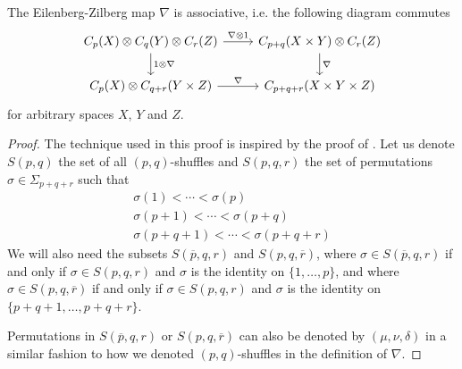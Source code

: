 \documentclass[TFM.tex]{subfiles}
\begin{document}
\begin{lemma}
The Eilenberg-Zilberg map $\nabla$ is associative, i.e. the following diagram commutes
\[
\begin{tikzcd}
C_p(X)\otimes C_q(Y)\otimes C_r(Z)\arrow[r, "\nabla\otimes 1"]\arrow[d, "1\otimes\nabla"] & C_{p+q}(X\times Y)\otimes C_r(Z)\arrow[d,"\nabla"]\\
C_p(X)\otimes C_{q+r}(Y\times Z)\arrow[r, "\nabla"] & C_{p+q+r}(X\times Y\times Z)
\end{tikzcd}
\]
for arbitrary spaces $X$, $Y$ and $Z$. 
\end{lemma} 

\begin{proof}
The technique used in this proof is inspired by the proof of \cite[Lemma 2.9]{Madsen}. Let us denote $S(p,q)$ the set of all $(p,q)$-shuffles and $S(p,q,r)$ the set of permutations $\sigma\in\Sigma_{p+q+r}$ such that 
\begin{gather*}
\sigma(1)<\cdots<\sigma(p)\\
\sigma(p+1)<\cdots<\sigma(p+q)\\
\sigma(p+q+1)<\cdots<\sigma(p+q+r)
\end{gather*}
We will also need the subsets $S(\overline{p},q,r)$ and $S(p,q,\overline{r})$, where $\sigma\in S(\overline{p},q,r)$ if and only if $\sigma\in S(p,q,r)$ and $\sigma$ is the identity on $\{1,\dots, p\}$, and where $\sigma\in S(p,q,\overline{r})$ if and only if $\sigma\in S(p,q,r)$ and $\sigma$ is the identity on $\{p+q+1,\dots, p+q+r\}$.

Permutations in $S(\overline{p},q,r)$ or $S(p,q,\overline{r})$ can also be denoted by $(\mu,\nu,\delta)$ in a similar fashion to how we denoted $(p,q)$-shuffles in the definition of $\nabla$. 


\end{proof}
\end{document}
